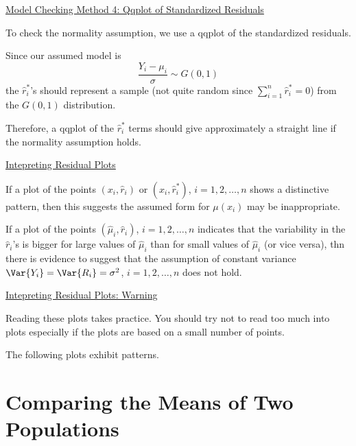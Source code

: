 \underline{Model Checking Method 4: Qqplot of Standardized Residuals}

To check the normality assumption, we use a qqplot of the standardized residuals.

Since our assumed model is
\[ \frac{Y_i-\mu_i}{\sigma}\sim G(0,1)  \]
the $ \hat{r}_i^* $'s should represent a sample (not quite random since $ \sum\limits_{i=1}^{n} \hat{r}_i^* =0 $)
from the $ G(0,1) $ distribution.

Therefore, a qqplot of the $ \hat{r}_i^* $ terms should give approximately a straight line if the normality
assumption holds.

\underline{Intepreting Residual Plots}

If a plot of the points $ (x_i,\hat{r}_i) $ or $ (x_i,\hat{r}_i^*) $, $ i=1,2,\ldots ,n $
shows a distinctive pattern, then this suggests the assumed form for $ \mu(x_i) $ may be inappropriate.

If a plot of the points $ \left( \hat{\mu}_i,\hat{r}_i \right) $, $ i=1,2,\ldots ,n $
indicates that the variability in the $ \hat{r}_i $'s is bigger for large values of $ \hat{\mu}_i $
than for small values of $ \hat{\mu}_i $ (or vice versa), thn there is evidence to suggest
that the assumption of constant variance $ \Var{Y_i}=\Var{R_i}=\sigma^2 $, $ i=1,2,\ldots ,n $
does not hold.

\underline{Intepreting Residual Plots: Warning}

Reading these plots takes practice. You should try not to read too much into plots especially
if the plots are based on a small number of points.

The following plots exhibit patterns.

\section{Comparing the Means of Two Populations}


